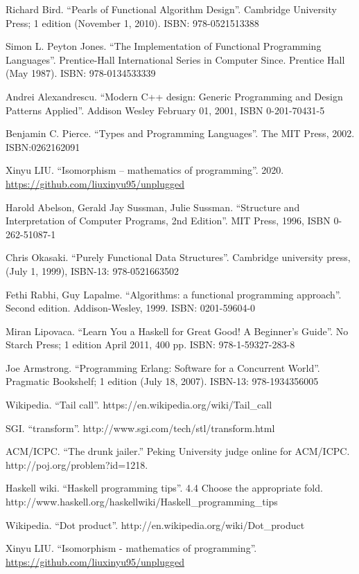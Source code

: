\documentclass[b5paper]{article}
\begin{document}

\begin{thebibliography}{99}

Richard Bird. ``Pearls of Functional Algorithm Design''. Cambridge University Press; 1 edition (November 1, 2010). ISBN: 978-0521513388

Simon L. Peyton Jones. ``The Implementation of Functional Programming Languages''. Prentice-Hall International Series in Computer Since. Prentice Hall (May 1987). ISBN: 978-0134533339

Andrei Alexandrescu. ``Modern C++ design: Generic Programming and Design Patterns Applied''. Addison Wesley February 01, 2001, ISBN 0-201-70431-5

Benjamin C. Pierce. ``Types and Programming Languages''. The MIT Press, 2002. ISBN:0262162091

Xinyu LIU. ``Isomorphism -- mathematics of programming''. 2020. \url{https://github.com/liuxinyu95/unplugged}

Harold Abelson, Gerald Jay Sussman, Julie Sussman. ``Structure and Interpretation of Computer Programs, 2nd Edition''. MIT Press, 1996, ISBN 0-262-51087-1

Chris Okasaki. ``Purely Functional Data Structures''. Cambridge university press, (July 1, 1999), ISBN-13: 978-0521663502

Fethi Rabhi, Guy Lapalme. ``Algorithms: a functional programming approach''. Second edition. Addison-Wesley, 1999. ISBN: 0201-59604-0

Miran Lipovaca. ``Learn You a Haskell for Great Good! A Beginner's Guide''. No Starch Press; 1 edition April 2011, 400 pp. ISBN: 978-1-59327-283-8

Joe Armstrong. ``Programming Erlang: Software for a Concurrent World''. Pragmatic Bookshelf; 1 edition (July 18, 2007). ISBN-13: 978-1934356005

Wikipedia. ``Tail call''. https://en.wikipedia.org/wiki/Tail\_call

SGI. ``transform''. http://www.sgi.com/tech/stl/transform.html

ACM/ICPC. ``The drunk jailer.'' Peking University judge online for ACM/ICPC. http://poj.org/problem?id=1218.

Haskell wiki. ``Haskell programming tips''. 4.4 Choose the appropriate fold. http://www.haskell.org/haskellwiki/Haskell\_programming\_tips

Wikipedia. ``Dot product''. http://en.wikipedia.org/wiki/Dot\_product

Xinyu LIU. ``Isomorphism - mathematics of programming''. \url{https://github.com/liuxinyu95/unplugged}

\end{thebibliography}

\ifx\wholebook\relax \else
\end{document}
